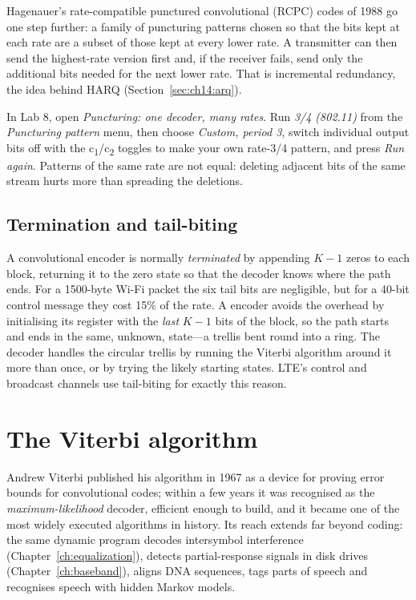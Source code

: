 Hagenauer's rate-compatible punctured convolutional (RCPC) codes of 1988 go one step further: a family
of puncturing patterns chosen so that the bits kept at each rate are a subset of those kept at every
lower rate. A transmitter can then send the highest-rate version first and, if the receiver fails,
send only the additional bits needed for the next lower rate. That is incremental redundancy, the
idea behind HARQ (Section~\ref{sec:ch14:arq}).

\begin{tryit}
In Lab 8, open \emph{Puncturing: one decoder, many rates}. Run \emph{3/4 (802.11)} from the
\emph{Puncturing pattern} menu, then choose \emph{Custom, period 3}, switch individual output bits off
with the c\textsubscript{1}/c\textsubscript{2} toggles to make your own rate-3/4 pattern, and press
\emph{Run again}. Patterns of the same rate
are not equal: deleting adjacent bits of the same stream hurts more than spreading the deletions.
\end{tryit}

\subsection{Termination and tail-biting}

A convolutional encoder is normally \emph{terminated} by appending $K-1$ zeros to each block, returning
it to the zero state so that the decoder knows where the path ends. For a 1500-byte Wi-Fi packet the six
tail bits are negligible, but for a 40-bit control message they cost 15\% of the rate. A
 encoder avoids the overhead by initialising its register with the \emph{last} $K-1$
bits of the block, so the path starts and ends in the same, unknown, state---a trellis bent round into
a ring. The decoder handles the circular trellis by running the Viterbi algorithm around it more than
once, or by trying the likely starting states. LTE's control and broadcast channels use tail-biting
for exactly this reason.

\section{The Viterbi algorithm}
\label{sec:ch14:viterbi}

Andrew Viterbi published his algorithm in 1967 as a device for proving error bounds for convolutional
codes; within a few years it was recognised as the \emph{maximum-likelihood} decoder, efficient enough to
build, and it became one of the most widely executed algorithms in history. Its reach extends far
beyond coding: the same dynamic program decodes intersymbol interference (Chapter~\ref{ch:equalization}),
detects partial-response signals in disk drives (Chapter~\ref{ch:baseband}), aligns DNA sequences, tags
parts of speech and recognises speech with hidden Markov models.

